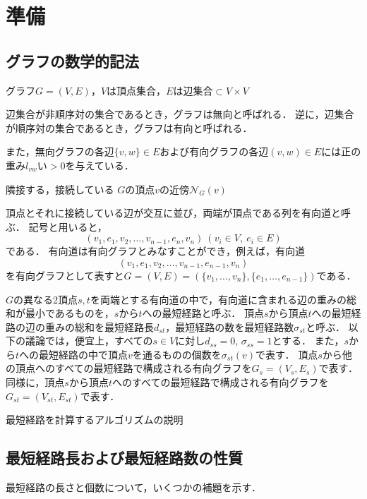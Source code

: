 \chapter{準備}

\section{グラフの数学的記法}

グラフ$G=(V,E)$，$V$は頂点集合，$E$は辺集合$\subset V\times V$

辺集合が非順序対の集合であるとき，グラフは無向と呼ばれる．
逆に，辺集合が順序対の集合であるとき，グラフは有向と呼ばれる．

また，無向グラフの各辺$\{v,w\}\in E$および有向グラフの各辺$(v,w)\in E$には正の重み$l_{vw}い>0$を与えている．

隣接する，接続している
$G$の頂点$v$の近傍$\mathcal{N}_G(v)$

頂点とそれに接続している辺が交互に並び，両端が頂点である列を有向道と呼ぶ．
記号と用いると，
\[ (v_1,e_1,v_2,\ldots,v_{n-1},e_n,v_n)\ (v_i\in V,\ e_i\in E) \]
である．
有向道は有向グラフとみなすことができ，例えば，有向道
\[ (v_1,e_1,v_2,\ldots,v_{n-1},e_{n-1},v_n) \]
を有向グラフとして表すと$G=(V,E)=(\{v_1,\ldots,v_n\},\{e_1,\ldots,e_{n-1}\})$である．

$G$の異なる2頂点$s,t$を両端とする有向道の中で，有向道に含まれる辺の重みの総和が最小であるものを，$s$から$t$への最短経路と呼ぶ．
頂点$s$から頂点$t$への最短経路の辺の重みの総和を最短経路長$d_{st}$，最短経路の数を最短経路数$\sigma_{st}$と呼ぶ．
以下の議論では，便宜上，すべての$s\in V$に対し$d_{ss}=0$, $\sigma_{ss}=1$とする．
また，$s$から$t$への最短経路の中で頂点$v$を通るものの個数を$\sigma_{st}(v)$で表す．
頂点$s$から他の頂点へのすべての最短経路で構成される有向グラフを$G_s=(V_s,E_s)$で表す．
同様に，頂点$s$から頂点$t$へのすべての最短経路で構成される有向グラフを$G_{st}=(V_{st},E_{st})$で表す．

最短経路を計算するアルゴリズムの説明

\section{最短経路長および最短経路数の性質}

最短経路の長さと個数について，いくつかの補題を示す．

